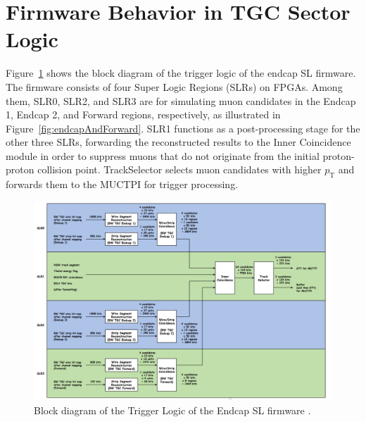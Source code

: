 \section{Firmware Behavior in TGC Sector Logic} \label{sec:TGCSL}
Figure~\ref{fig:blockDiagram} shows the block diagram of the trigger logic of the endcap SL firmware. The firmware consists of four Super Logic Regions (SLRs) on FPGAs. Among them, SLR0, SLR2, and SLR3 are for simulating muon candidates in the Endcap 1, Endcap 2, and Forward regions, respectively, as illustrated in Figure~\ref{fig:endcapAndForward}. SLR1 functions as a post-processing stage for the other three SLRs, forwarding the reconstructed results to the Inner Coincidence module in order to suppress muons that do not originate from the initial proton-proton collision point.
TrackSelector selects muon candidates with higher $p_\mathrm{T}$ and forwards them to the MUCTPI for trigger processing.
\begin{figure}
  \centering
  \includegraphics[width=1.0\textwidth]{figs/chapter5/block_diagram_of_trigger_logic.png}
  \caption{Block diagram of the Trigger Logic of the Endcap SL firmware \cite{EndcapSLPDR}.}
  \label{fig:blockDiagram}
\end{figure}

